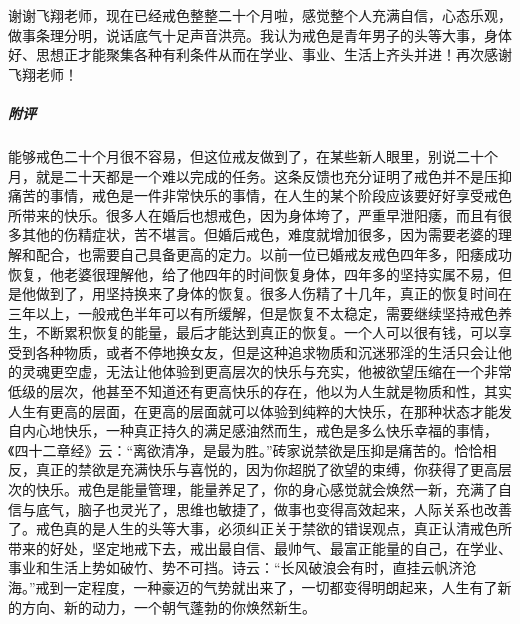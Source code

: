 \begin{case}
    谢谢飞翔老师，现在已经戒色整整二十个月啦，感觉整个人充满自信，心态乐观，做事条理分明，说话底气十足声音洪亮。我认为戒色是青年男子的头等大事，身体好、思想正才能聚集各种有利条件从而在学业、事业、生活上齐头并进！再次感谢飞翔老师！
    \subparagraph{附评} 能够戒色二十个月很不容易，但这位戒友做到了，在某些新人眼里，别说二十个月，就是二十天都是一个难以完成的任务。这条反馈也充分证明了戒色并不是压抑痛苦的事情，戒色是一件非常快乐的事情，在人生的某个阶段应该要好好享受戒色所带来的快乐。很多人在婚后也想戒色，因为身体垮了，严重早泄阳痿，而且有很多其他的伤精症状，苦不堪言。但婚后戒色，难度就增加很多，因为需要老婆的理解和配合，也需要自己具备更高的定力。以前一位已婚戒友戒色四年多，阳痿成功恢复，他老婆很理解他，给了他四年的时间恢复身体，四年多的坚持实属不易，但是他做到了，用坚持换来了身体的恢复。很多人伤精了十几年，真正的恢复时间在三年以上，一般戒色半年可以有所缓解，但是恢复不太稳定，需要继续坚持戒色养生，不断累积恢复的能量，最后才能达到真正的恢复。一个人可以很有钱，可以享受到各种物质，或者不停地换女友，但是这种追求物质和沉迷邪淫的生活只会让他的灵魂更空虚，无法让他体验到更高层次的快乐与充实，他被欲望压缩在一个非常低级的层次，他甚至不知道还有更高快乐的存在，他以为人生就是物质和性，其实人生有更高的层面，在更高的层面就可以体验到纯粹的大快乐，在那种状态才能发自内心地快乐，一种真正持久的满足感油然而生，戒色是多么快乐幸福的事情，《四十二章经》云：“离欲清净，是最为胜。”砖家说禁欲是压抑是痛苦的。恰恰相反，真正的禁欲是充满快乐与喜悦的，因为你超脱了欲望的束缚，你获得了更高层次的快乐。戒色是能量管理，能量养足了，你的身心感觉就会焕然一新，充满了自信与底气，脑子也灵光了，思维也敏捷了，做事也变得高效起来，人际关系也改善了。戒色真的是人生的头等大事，必须纠正关于禁欲的错误观点，真正认清戒色所带来的好处，坚定地戒下去，戒出最自信、最帅气、最富正能量的自己，在学业、事业和生活上势如破竹、势不可挡。诗云：“长风破浪会有时，直挂云帆济沧海。”戒到一定程度，一种豪迈的气势就出来了，一切都变得明朗起来，人生有了新的方向、新的动力，一个朝气蓬勃的你焕然新生。
\end{case}

